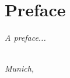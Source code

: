 \chapter*{Preface}

\emph{A preface...}

\begin{flushright}
{\makeatletter\itshape
    \@author \\
    Munich, \monthname{} \the\year{}
\makeatother}
\end{flushright}

